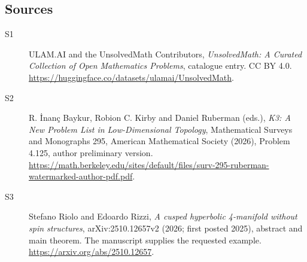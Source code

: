 \documentclass[11pt]{article}
\begin{document}
\subsection{Sources}
\begin{description}
\item[\hypertarget{source:statement:1}{S1}] ULAM.AI and the UnsolvedMath Contributors, \emph{UnsolvedMath: A Curated Collection of Open Mathematics Problems}, catalogue entry. CC BY 4.0. \url{https://huggingface.co/datasets/ulamai/UnsolvedMath}.
\item[\hypertarget{source:statement:2}{S2}] R. İnanç Baykur, Robion C. Kirby and Daniel Ruberman (eds.), \emph{K3: A New Problem List in Low-Dimensional Topology}, Mathematical Surveys and Monographs 295, American Mathematical Society (2026), Problem 4.125, author preliminary version. \url{https://math.berkeley.edu/sites/default/files/surv-295-ruberman-watermarked-author-pdf.pdf}.
\item[\hypertarget{source:statement:3}{S3}] Stefano Riolo and Edoardo Rizzi, \emph{A cusped hyperbolic 4-manifold without spin structures}, arXiv:2510.12657v2 (2026; first posted 2025), abstract and main theorem. The manuscript supplies the requested example. \url{https://arxiv.org/abs/2510.12657}.
\end{description}
\label{end:statement}
\end{document}
